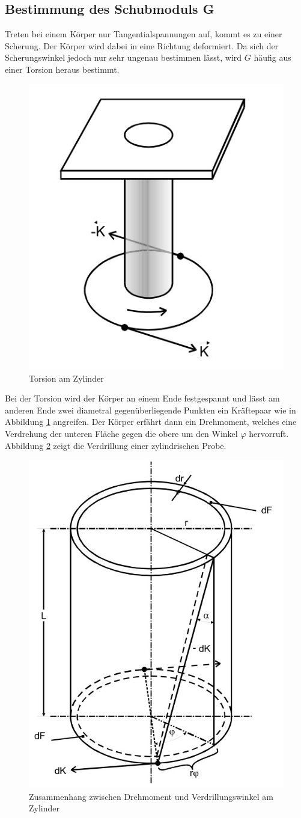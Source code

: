 \subsection{Bestimmung des Schubmoduls G}
Treten bei einem Körper nur Tangentialspannungen auf, kommt es zu einer Scherung.
Der Körper wird dabei in eine Richtung deformiert. Da sich der Scherungswinkel
jedoch nur sehr ungenau bestimmen lässt, wird $G$ häufig aus einer Torsion heraus
bestimmt.
\begin{figure}
  \centering
  \includegraphics[height=0.5\textwidth]{bilder/torsion.jpg}
  \caption{Torsion am Zylinder}
  \label{torsion}
\end{figure}
Bei der Torsion wird der Körper an einem Ende festgespannt und lässt am anderen
Ende zwei diametral gegenüberliegende Punkten ein Kräftepaar wie in Abbildung
\ref{torsion} angreifen. Der Körper erfährt dann ein Drehmoment, welches eine
Verdrehung der unteren Fläche gegen die obere um den Winkel $\varphi$ hervorruft.
 Abbildung \ref{drill} zeigt die Verdrillung einer zylindrischen Probe.
\begin{figure}[H]
  \centering
  \includegraphics[height=0.5\textwidth]{bilder/verdrillung.jpg}
  \caption{Zusammenhang zwischen Drehmoment und Verdrillungswinkel am Zylinder
  \cite{102}}
  \label{drill}
\end{figure}
